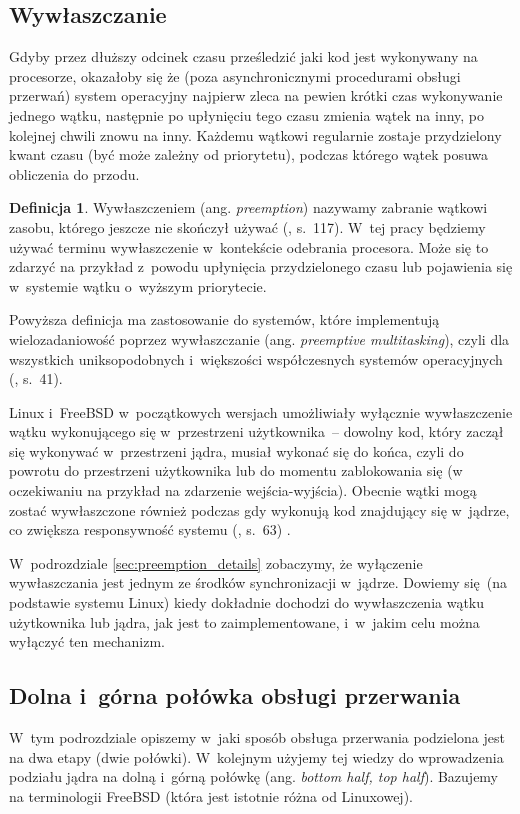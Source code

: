 \documentclass[shortabstract]{iithesis}
\theoremstyle{definition} \newtheorem*{definition}{Definicja}
\theoremstyle{definition} \newtheorem*{example}{Przykład}
\theoremstyle{definition} \newtheorem*{remark}{Uwaga}
\begin{document}
\subsection{Wywłaszczanie}
\label{sec:preemption_basics}
Gdyby przez dłuższy odcinek czasu prześledzić jaki kod jest wykonywany na procesorze, okazałoby się że
(poza asynchronicznymi procedurami obsługi przerwań) system operacyjny najpierw zleca na pewien krótki czas
wykonywanie jednego wątku, następnie po upłynięciu tego czasu zmienia wątek na inny, po kolejnej chwili znowu
na inny. Każdemu wątkowi regularnie zostaje przydzielony kwant czasu (być może zależny od priorytetu),
podczas którego wątek posuwa obliczenia do przodu.

\begin{definition}
Wywłaszczeniem (ang. \textit{preemption}) nazywamy zabranie wątkowi zasobu, którego jeszcze nie skończył
używać (\cite{bib:stallings}, s.~117).
W~tej pracy będziemy używać terminu wywłaszczenie w~kontekście odebrania procesora.
Może się to zdarzyć na przykład z~powodu upłynięcia przydzielonego czasu lub pojawienia się w~systemie
wątku o~wyższym priorytecie. \end{definition}

Powyższa definicja ma zastosowanie do systemów, które implementują wielozadaniowość poprzez wywłaszczanie
(ang. \textit{preemptive multitasking}), czyli dla wszystkich uniksopodobnych i~większości
współczesnych systemów operacyjnych (\cite{bib:lkd}, s.~41).

Linux i~FreeBSD w~początkowych wersjach umożliwiały wyłącznie wywłaszczenie wątku wykonującego się
w~przestrzeni użytkownika~-- dowolny kod, który zaczął się wykonywać w~przestrzeni jądra,
musiał wykonać się do końca, czyli do powrotu do przestrzeni użytkownika lub do momentu zablokowania się
(w oczekiwaniu na przykład na zdarzenie wejścia-wyjścia).
Obecnie wątki mogą zostać wywłaszczone również podczas gdy wykonują kod znajdujący się w~jądrze,
co zwiększa responsywność systemu (\cite{bib:lkd}, s.~63) \cite{bib:freebsd-doc:preemptive_kernel}.

W~podrozdziale \ref{sec:preemption_details} zobaczymy, że wyłączenie wywłaszczania jest jednym
ze środków synchronizacji w~jądrze. Dowiemy się (na podstawie systemu Linux) kiedy dokładnie
dochodzi do wywłaszczenia wątku użytkownika lub jądra, jak jest to zaimplementowane,
i~w~jakim celu można wyłączyć ten mechanizm.

\subsection{Dolna i~górna połówka obsługi przerwania}
W~tym podrozdziale opiszemy w~jaki sposób obsługa przerwania podzielona jest na dwa etapy (dwie połówki).
W~kolejnym użyjemy tej wiedzy do
wprowadzenia podziału jądra na dolną i~górną połówkę (ang. \textit{bottom half, top half}). Bazujemy na
terminologii FreeBSD (która jest istotnie różna od Linuxowej).
\end{document}
